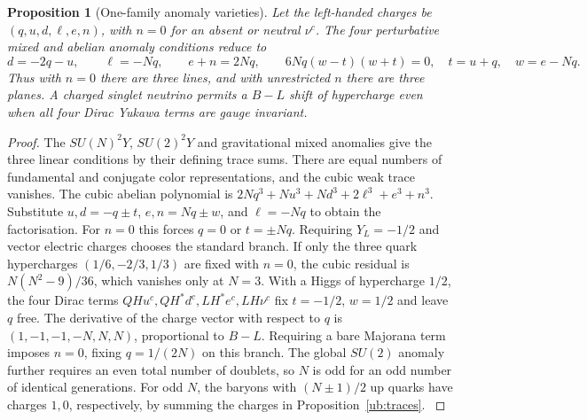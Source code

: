 \documentclass[aps,pra,onecolumn,superscriptaddress,nofootinbib,10pt]{revtex4-2}
\newtheorem{proposition}[theorem]{Proposition}
\theoremstyle{definition}
\theoremstyle{remark}
\begin{document}
\begin{proposition}[One-family anomaly varieties]\label{ub:anomalies}
Let the left-handed charges be $(q,u,d,\ell,e,n)$, with $n=0$ for an
absent or neutral $\nu^c$. The four perturbative mixed and abelian anomaly
conditions reduce to
\[
 d=-2q-u,\qquad \ell=-Nq,\qquad e+n=2Nq,\qquad
 6Nq(w-t)(w+t)=0,\quad t=u+q,\quad w=e-Nq .
\]
Thus with $n=0$ there are three lines, and with unrestricted $n$ there
are three planes. A charged singlet neutrino permits a $B-L$ shift of
hypercharge even when all four Dirac Yukawa terms are gauge invariant.
\end{proposition}
\begin{proof}
The $SU(N)^2Y$, $SU(2)^2Y$ and gravitational mixed anomalies give the
three linear conditions by their defining trace sums. There are equal
numbers of fundamental and conjugate color representations, and the
cubic weak trace vanishes. The cubic abelian polynomial is
$2Nq^3+Nu^3+Nd^3+2\ell^3+e^3+n^3$. Substitute
$u,d=-q\pm t$, $e,n=Nq\pm w$, and $\ell=-Nq$ to obtain the factorisation.
For $n=0$ this forces $q=0$ or $t=\pm Nq$. Requiring $Y_L=-1/2$
and vector electric charges chooses the standard branch.
If only the three quark hypercharges $(1/6,-2/3,1/3)$ are fixed with
$n=0$, the cubic residual is $N(N^2-9)/36$, which vanishes only at $N=3$.
With a Higgs of hypercharge $1/2$, the four Dirac terms
$QHu^c,QH^*d^c,LH^*e^c,LH\nu^c$ fix $t=-1/2$, $w=1/2$
and leave $q$ free. The derivative of the charge vector with respect to
$q$ is $(1,-1,-1,-N,N,N)$, proportional to $B-L$. Requiring a bare
Majorana term imposes $n=0$, fixing $q=1/(2N)$ on this branch. The global
$SU(2)$ anomaly further requires an even total number of doublets,
so $N$ is odd for an odd number of identical generations. For odd $N$,
the baryons with $(N\pm1)/2$ up quarks have charges $1,0$, respectively,
by summing the charges in Proposition~\ref{ub:traces}.
\cite{ub:geng,ub:witten,ub:bar,ub:babu}
\end{proof}
\end{document}
